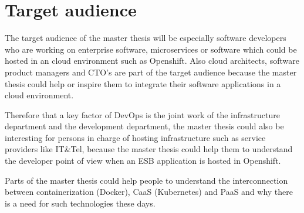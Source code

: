 \section{Target audience}
\label{sec:target-audience}
The target audience of the master thesis will be especially software developers who are working on enterprise software, microservices or software which could be hosted in an cloud environment such as Openshift. Also cloud architects, software product managers and CTO's are part of the target audience because the master thesis could help or inspire them to integrate their software applications in a cloud environment.

Therefore that a key factor of DevOps is the joint work of the infrastructure department and the development department, the master thesis could also be interesting for persons in charge of hosting infrastructure such as service providers like IT\&Tel, because the master thesis could help them to understand the developer point of view when an ESB application is hosted in Openshift.

Parts of the master thesis could help people to understand the interconnection between containerization (Docker), CaaS (Kubernetes) and PaaS and why there is a need for such technologies these days.





